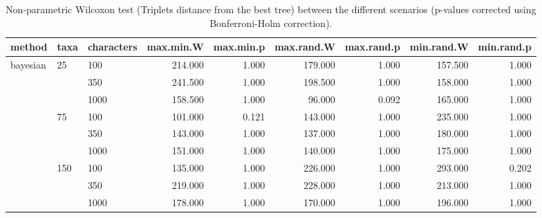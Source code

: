 \begin{table}[ht]
\centering
\begin{tabular}{lllrrrrrr}
  \hline
method & taxa & characters & max.min.W & max.min.p & max.rand.W & max.rand.p & min.rand.W & min.rand.p \\ 
  \hline
bayesian & 25 & 100 & 214.000 & 1.000 & 179.000 & 1.000 & 157.500 & 1.000 \\ 
   &  & 350 & 241.500 & 1.000 & 198.500 & 1.000 & 158.000 & 1.000 \\ 
   &  & 1000 & 158.500 & 1.000 & 96.000 & 0.092 & 165.000 & 1.000 \\ 
   & 75 & 100 & 101.000 & 0.121 & 143.000 & 1.000 & 235.000 & 1.000 \\ 
   &  & 350 & 143.000 & 1.000 & 137.000 & 1.000 & 180.000 & 1.000 \\ 
   &  & 1000 & 151.000 & 1.000 & 140.000 & 1.000 & 175.000 & 1.000 \\ 
   & 150 & 100 & 135.000 & 1.000 & 226.000 & 1.000 & 293.000 & 0.202 \\ 
   &  & 350 & 219.000 & 1.000 & 228.000 & 1.000 & 213.000 & 1.000 \\ 
   &  & 1000 & 178.000 & 1.000 & 170.000 & 1.000 & 196.000 & 1.000 \\ 
   \hline
\end{tabular}
\caption{Non-parametric Wilcoxon test (Triplets distance from the best tree) between the different scenarios (p-values corrected using Bonferroni-Holm correction).} 
\label{Full_Tab_Bayesian_WXTrbest}
\end{table}
